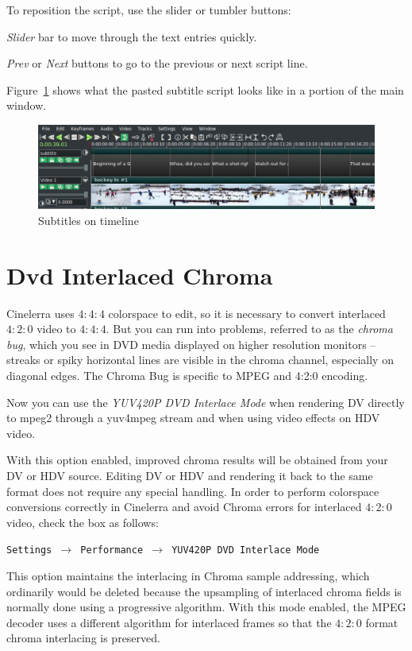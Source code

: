 \noindent To reposition the script, use the slider or tumbler buttons:

\textit{Slider} bar to move through the text entries quickly.

\textit{Prev} or \textit{Next} buttons to go to the previous or next script line.

\noindent Figure~\ref{fig:subtitle02} shows what the pasted subtitle script looks like in a portion of the main window.

\begin{figure}[htpb]
    \centering
    \includegraphics[width=0.9\linewidth]{images/subtitle02.png}
    \caption{Subtitles on timeline}
    \label{fig:subtitle02}
\end{figure}

\section{Dvd Interlaced Chroma}%
\label{sec:dvd_interlaced_chroma}

Cinelerra uses $4:4:4$ colorspace to edit, so it is necessary to convert interlaced $4:2:0$ video to $4:4:4$.
But you can run into problems, referred to as the \textit{chroma bug}, which you see in DVD media displayed on higher resolution monitors -- streaks or spiky horizontal lines are visible in the chroma channel, especially on diagonal edges. The Chroma Bug is specific to MPEG and 4:2:0 encoding.

Now you can use the \textit{YUV420P DVD Interlace Mode} when rendering DV directly to mpeg2 through a yuv4mpeg stream and when using video effects on HDV video.

With this option enabled, improved chroma results will be obtained from your DV or HDV source.
Editing DV or HDV and rendering it back to the same format does not require any special handling.
In order to perform colorspace conversions correctly in Cinelerra and avoid Chroma errors for interlaced $4:2:0$ video, check the box as follows:

\texttt{Settings $\rightarrow$ Performance $\rightarrow$ YUV420P DVD Interlace Mode}

This option maintains the interlacing in Chroma sample addressing, which ordinarily would be deleted
because the upsampling of interlaced chroma fields is normally done using a progressive algorithm.
With this mode enabled, the MPEG decoder uses a different algorithm for interlaced frames so that the
$4:2:0$ format chroma interlacing is preserved.

